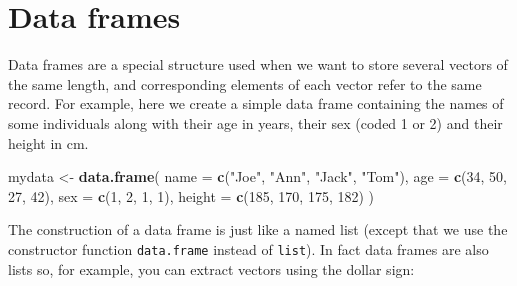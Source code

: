 \documentclass[
]{book}
\newenvironment{Shaded}{\begin{snugshade}}{\end{snugshade}}
\newcommand{\AttributeTok}[1]{\textcolor[rgb]{0.13,0.29,0.53}{#1}}
\newcommand{\DecValTok}[1]{\textcolor[rgb]{0.00,0.00,0.81}{#1}}
\newcommand{\FunctionTok}[1]{\textcolor[rgb]{0.13,0.29,0.53}{\textbf{#1}}}
\newcommand{\NormalTok}[1]{#1}
\newcommand{\OtherTok}[1]{\textcolor[rgb]{0.56,0.35,0.01}{#1}}
\newcommand{\SpecialCharTok}[1]{\textcolor[rgb]{0.81,0.36,0.00}{\textbf{#1}}}
\newcommand{\StringTok}[1]{\textcolor[rgb]{0.31,0.60,0.02}{#1}}
\begin{document}
\begin{Shaded}
\end{Shaded}

\section{Data frames}\label{data-frames}

Data frames are a special structure used when we want to store several vectors of the
same length, and corresponding elements of each vector refer to the same record.
For example, here we create a simple data frame containing the names of some individuals
along with their age in years, their sex (coded 1 or 2) and their height in cm.

\begin{Shaded}
\begin{Highlighting}[]
\NormalTok{mydata }\OtherTok{\textless{}{-}} \FunctionTok{data.frame}\NormalTok{(}
  \AttributeTok{name =} \FunctionTok{c}\NormalTok{(}\StringTok{"Joe"}\NormalTok{, }\StringTok{"Ann"}\NormalTok{, }\StringTok{"Jack"}\NormalTok{, }\StringTok{"Tom"}\NormalTok{),}
  \AttributeTok{age =} \FunctionTok{c}\NormalTok{(}\DecValTok{34}\NormalTok{, }\DecValTok{50}\NormalTok{, }\DecValTok{27}\NormalTok{, }\DecValTok{42}\NormalTok{), }\AttributeTok{sex =} \FunctionTok{c}\NormalTok{(}\DecValTok{1}\NormalTok{, }\DecValTok{2}\NormalTok{, }\DecValTok{1}\NormalTok{, }\DecValTok{1}\NormalTok{),}
  \AttributeTok{height =} \FunctionTok{c}\NormalTok{(}\DecValTok{185}\NormalTok{, }\DecValTok{170}\NormalTok{, }\DecValTok{175}\NormalTok{, }\DecValTok{182}\NormalTok{)}
\NormalTok{)}
\end{Highlighting}
\end{Shaded}

The construction of a data frame is just like a named list (except
that we use the constructor function \texttt{data.frame} instead of \texttt{list}). In fact data frames are also lists so, for example, you can
extract vectors using the dollar sign:

\begin{Shaded}
\end{Shaded}
\end{document}
